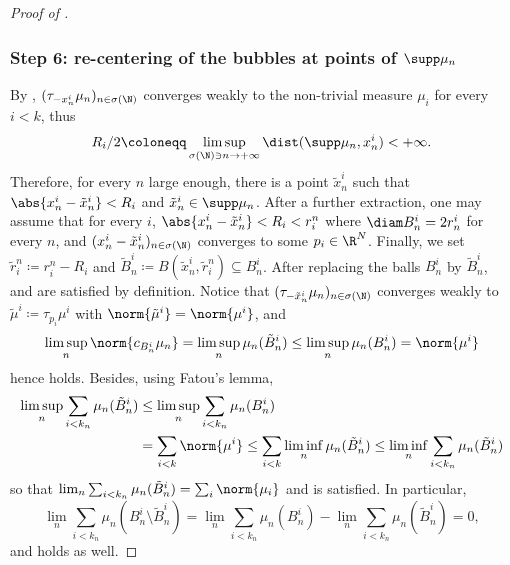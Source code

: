 \begin{proof}[Proof of ]
\subsubsection*{Step 6: re-centering of the bubbles at points of \(\supp\mu_n\)}
By , $(\tau_{-x^i_{n}} \mu_n)_{n \in \sigma(\N)}$ converges weakly to the non-trivial measure $\mu_i$ for every $i<k$, thus
\begin{equation}
\label{finiteDistance}
R_i/2\coloneqq \limsup_{\sigma(\N) \ni n \to +\infty} \dist(\supp \mu_n, x_n^i) < +\infty.
\end{equation}
Therefore, for every $n$ large enough, there is a point $\tilde x_n^i$ such that $\abs{x_n^i-\tilde x_n^i} < R_i$ and $\tilde x_n^i \in \supp \mu_n$. After a further extraction, one may assume that for every $i$, $\abs{x_n^i-\tilde x_n^i} < R_i < r_i^n$ where $\diam B_n^i = 2r_n^i$ for every $n$, and $(x_n^i -\tilde x_n^i)_{n\in \sigma(\N)}$ converges to some $p_i \in \R^N$. Finally, we set $\tilde r_i^n \coloneqq r_i^n-R_i$ and $\tilde B_n^i \coloneqq B(\tilde x_n^i,\tilde r_i^n) \subseteq B_n^i$. After replacing the balls $B_n^i$ by $\tilde B_n^i$,  and  are satisfied by definition. Notice that $(\tau_{-\tilde x^i_{n}} \mu_n)_{n \in \sigma(\N)}$ converges weakly to $\tilde \mu^i \coloneqq \tau_{p_i} \mu^i$ with $\norm{\tilde \mu^i} = \norm{\mu^i}$, and
\[
\limsup_n \norm{c_{B_n^i} \mu_n} = \limsup_n \mu_n(\tilde B_n^i) \leq \limsup_n \mu_n(B_n^i) = \norm{\mu^i}
\]
hence  holds. Besides, using Fatou's lemma,
\begin{align*}
\limsup_n \sum_{i<k_n} \mu_n(\tilde B_n^i) &\leq \limsup_n \sum_{i<k_n} \mu_n(B_n^i)\\
&= \sum_{i<k} \norm{\mu^i}\leq \sum_{i<k} \liminf_n \mu_n(\tilde B_n^i) \leq \liminf_n \sum_{i<k_n} \mu_n(\tilde B_n^i)
\end{align*}
so that $\lim_n \sum_{i<k_n} \mu_n(\tilde B_n^i) = \sum_i \norm{\mu_i}$ and  is satisfied. In particular,
\[\lim_n \sum_{i<k_n} \mu_n(B_n^i\setminus \tilde B_n^i) = \lim_n \sum_{i<k_n} \mu_n(B_n^i) - \lim_n \sum_{i<k_n} \mu_n(\tilde B_n^i) = 0,\]
and  holds as well.
\end{proof}
